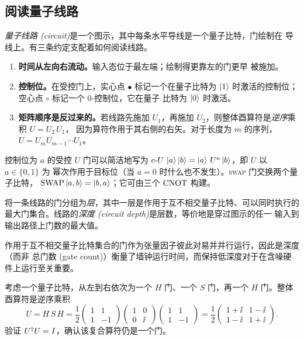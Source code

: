\subsection{阅读量子线路}

\emph{量子线路 (circuit)}是一个图示，其中每条水平导线是一个量子比特，门绘制在
导线上。有三条约定支配着如何阅读线路。
\begin{enumerate}[label=(\arabic*)]
  \item \textbf{时间从左向右流动。}输入态位于最左端；绘制得更靠左的门更早
        被施加。
  \item \textbf{控制位。}在受控门上，实心点 $\bullet$ 标记一个在量子比特为
        $\ket{1}$ 时激活的控制位；空心点 $\circ$ 标记一个 $0$-控制位，它在量子
        比特为 $\ket{0}$ 时激活。
  \item \textbf{矩阵顺序是反过来的。}若线路先施加 $U_{1}$，再施加
        $U_{2}$，则整体酉算符是\emph{逆序}乘积 $U=U_{2}\,U_{1}$，
        因为算符作用于其右侧的右矢。对于长度为 $m$ 的序列，
        $U=U_{m}U_{m-1}\cdots U_{1}$。
\end{enumerate}

控制位为 $a$ 的受控 $U$ 门可以简洁地写为
$c\text{-}U\,\ket{a}\ket{b}=\ket{a}\,U^{a}\ket{b}$，即 $U$ 以 $a\in\{0,1\}$ 为
幂次作用于目标位（当 $a=0$ 时什么也不发生）。\textsc{swap} 门交换两个量子比特，
$\mathrm{SWAP}\ket{a,b}=\ket{b,a}$；它可由三个 $\mathrm{CNOT}$ 构建。

\begin{definition}[线路深度]\label{def:lec01-depth}
将一条线路的门分组为\emph{层}，其中一层是作用于互不相交量子比特、可以同时执行的
最大门集合。线路的\emph{深度 (circuit depth)}是层数，等价地是穿过图示的任一
输入到输出路径上门数的最大值。
\end{definition}

作用于互不相交量子比特集合的门作为张量因子彼此对易并并行运行，因此是深度（而非
总门数 (gate count)）衡量了墙钟运行时间，而保持低深度对于在含噪硬件上运行至关重要。

\begin{example}[将小线路的酉算符写为逆序乘积]
考虑一个量子比特，从左到右依次为一个 $H$ 门、一个 $S$ 门，再一个 $H$ 门。整体
酉算符是逆序乘积
\[
  U = H\,S\,H
    = \frac{1}{2}\begin{pmatrix}1&1\\1&-1\end{pmatrix}
      \begin{pmatrix}1&0\\0&\ii\end{pmatrix}
      \begin{pmatrix}1&1\\1&-1\end{pmatrix}
    = \frac{1}{2}\begin{pmatrix}1+\ii&1-\ii\\1-\ii&1+\ii\end{pmatrix}.
\]
验证 $U^{\dagger} U=I$，确认该复合算符仍是一个门。
\end{example}

